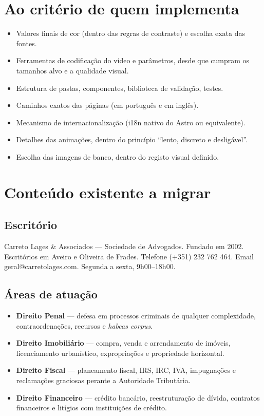 \documentclass[11pt,a4paper]{article}
\begin{document}
\section{Ao critério de quem implementa}
\begin{itemize}
  \item Valores finais de cor (dentro das regras de contraste) e escolha exata das fontes.
  \item Ferramentas de codificação do vídeo e parâmetros, desde que cumpram os tamanhos alvo e a qualidade visual.
  \item Estrutura de pastas, componentes, biblioteca de validação, testes.
  \item Caminhos exatos das páginas (em português e em inglês).
  \item Mecanismo de internacionalização (i18n nativo do Astro ou equivalente).
  \item Detalhes das animações, dentro do princípio ``lento, discreto e desligável''.
  \item Escolha das imagens de banco, dentro do registo visual definido.
\end{itemize}

\appendix
\section{Conteúdo existente a migrar}\label{ap:conteudo}

\subsection*{Escritório}
Carreto Lages \& Associados --- Sociedade de Advogados. Fundado em 2002. Escritórios em Aveiro e Oliveira de Frades. Telefone (+351) 232 762 464. Email geral@carretolages.com. Segunda a sexta, 9h00--18h00.

\subsection*{Áreas de atuação}
\begin{itemize}
  \item \textbf{Direito Penal} --- defesa em processos criminais de qualquer complexidade, contraordenações, recursos e \textit{habeas corpus}.
  \item \textbf{Direito Imobiliário} --- compra, venda e arrendamento de imóveis, licenciamento urbanístico, expropriações e propriedade horizontal.
  \item \textbf{Direito Fiscal} --- planeamento fiscal, IRS, IRC, IVA, impugnações e reclamações graciosas perante a Autoridade Tributária.
  \item \textbf{Direito Financeiro} --- crédito bancário, reestruturação de dívida, contratos financeiros e litígios com instituições de crédito.
\end{itemize}
\end{document}
